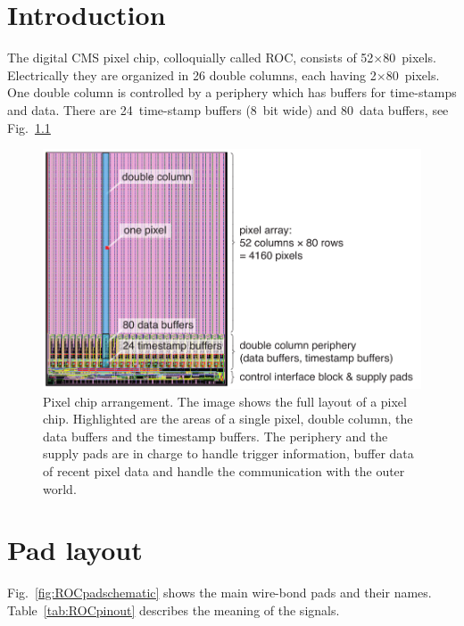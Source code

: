 \chapter{Introduction}

The digital CMS pixel chip, colloquially called \gls{ROC}, consists of 52$\times$80~pixels. Electrically they are organized in 26 double columns, each having 2$\times$80~pixels. One double column is controlled by a periphery which has buffers for time-stamps and data. There are 24~time-stamp buffers (8~bit wide) and 80~data buffers, see Fig.~\ref{fig:ROCimage}

\begin{figure}[hbtp]
	\begin{center}
	\includegraphics[width=.9\textwidth]{img/ROCimage.pdf}
	\end{center}
	\caption{Pixel chip arrangement. The image shows the full layout of a pixel chip. Highlighted are the areas of a single pixel, double column, the data buffers and the timestamp buffers. The periphery and the supply pads are in charge to handle trigger information, buffer data of recent pixel data and handle the communication with the outer world.}
	\label{fig:ROCimage}
\end{figure}

\chapter{Pad layout}

Fig.~\ref{fig:ROCpadschematic} shows the main wire-bond pads and their names. Table~\ref{tab:ROCpinout} describes the meaning of the signals. 

